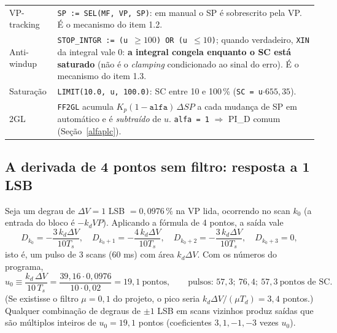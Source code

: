 \begin{center}
\begin{longtable}{p{3.4cm}p{11.2cm}}
VP-tracking & \texttt{SP := SEL(MF, VP, SP)}: em manual o SP é sobrescrito pela VP. É o mecanismo do item 1.2.\\
Anti-windup & \texttt{STOP\_INTGR := (u $\ge100$) OR (u $\le10$)}; quando verdadeiro, \texttt{XIN} da integral vale 0: \textbf{a integral congela enquanto o SC está saturado} (não é o \emph{clamping} condicionado ao sinal do erro). É o mecanismo do item 1.3.\\
Saturação & \texttt{LIMIT(10.0, u, 100.0)}: SC entre 10 e 100\,\% (\texttt{SC = u$\cdot655{,}35$}).\\
2GL & \texttt{FF2GL} acumula $K_p(1-\mathtt{alfa})\,\Delta SP$ a cada mudança de SP em automático e é \emph{subtraído} de $u$. \texttt{alfa = 1} $\Rightarrow$ PI\_D comum (Seção~\ref{alfaplc}).\\\bottomrule
\end{longtable}\end{center}
\subsection{A derivada de 4 pontos sem filtro: resposta a 1 LSB}\label{deriv4}
Seja um degrau de $\Delta V=1$ LSB $=0{,}0976\,\%$ na VP lida, ocorrendo no scan $k_0$ (a entrada do bloco é $-k_dVP$). Aplicando a fórmula de 4 pontos, a saída vale
\[
D_{k_0}=-\frac{3\,k_d\Delta V}{10T_s},\quad D_{k_0+1}=-\frac{4\,k_d\Delta V}{10T_s},\quad D_{k_0+2}=-\frac{3\,k_d\Delta V}{10T_s},\quad D_{k_0+3}=0,
\]
isto é, um pulso de 3 scans (60 ms) com área $k_d\Delta V$. Com os números do programa,
\[
u_0\equiv\frac{k_d\,\Delta V}{10\,T_s}=\frac{39{,}16\cdot0{,}0976}{10\cdot0{,}02}=19{,}1\ \text{pontos},\qquad\text{pulsos: }57{,}3;\ 76{,}4;\ 57{,}3\ \text{pontos de SC}.
\]
(Se existisse o filtro $\mu=0{,}1$ do projeto, o pico seria $k_d\Delta V/(\mu T_d)=3{,}4$ pontos.) Qualquer combinação de degraus de $\pm1$ LSB em scans vizinhos produz saídas que são múltiplos inteiros de $u_0=19{,}1$ pontos (coeficientes $3,1,-1,-3$ vezes $u_0$).

